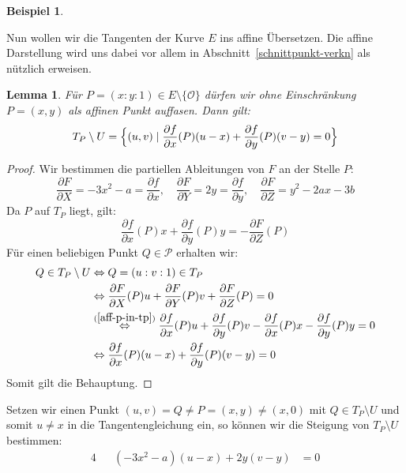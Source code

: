 \documentclass[hidelinks]{article}
\theoremstyle{plain}
\newtheorem{lem}[thm]{Lemma}
\theoremstyle{definition}
\newtheorem{bsp}[thm]{Beispiel}
\theoremstyle{rem}
\newcommand{\patinf}{\mathcal{O}}
\begin{document}
\begin{sloppypar}
\begin{bsp}
\end{bsp}
Nun wollen wir die Tangenten der Kurve $E$ ins affine Übersetzen. Die affine Darstellung wird uns dabei vor allem in Abschnitt~\ref{schnittpunkt-verkn} als nützlich erweisen.
\begin{lem}\label{aff-tang}
    Für $P=(x:y:1)\in E\setminus\{\patinf\}$ dürfen wir ohne Einschränkung $P=(x,y)$ als affinen Punkt auffasen. Dann gilt:
    \begin{equation*}
        T_P\setminus U =\Bigl\{(u,v)\mid \frac{\partial f}{\partial x}(P)(u-x)+\frac{\partial f}{\partial y}(P)(v-y)=0\Bigr\}
    \end{equation*}
\end{lem}
\begin{proof}
    Wir bestimmen die partiellen Ableitungen von $F$ an der Stelle $P$:
    \begin{equation*}
        \frac{\partial F}{\partial X}=-3x^2-a=\frac{\partial f}{\partial x},\quad \frac{\partial F}{\partial Y}=2y=\frac{\partial f}{\partial y},\quad \frac{\partial F}{\partial Z}=y^2-2ax-3b
    \end{equation*}
    Da $P$ auf $T_P$ liegt, gilt:
    \begin{equation}\label{aff-p-in-tp}
        \frac{\partial f}{\partial x}(P)x+\frac{\partial f}{\partial y}(P)y=-\frac{\partial F}{\partial Z}(P)
    \end{equation}
    Für einen beliebigen Punkt $Q\in\mathcal{P}$ erhalten wir:
    \begin{align*}
        Q\in T_P\setminus U & \Leftrightarrow Q=(u:v:1)\in T_P\\
        & \Leftrightarrow \frac{\partial F}{\partial X}(P)u+\frac{\partial F}{\partial Y}(P)v+\frac{\partial F}{\partial Z}(P)=0\\
        & \stackrel{(\ref{aff-p-in-tp})}{\Leftrightarrow} \frac{\partial f}{\partial x}(P)u+\frac{\partial f}{\partial y}(P)v-\frac{\partial f}{\partial x}(P)x-\frac{\partial f}{\partial y}(P)y=0\\
        & \Leftrightarrow \frac{\partial f}{\partial x}(P)(u-x)+\frac{\partial f}{\partial y}(P)(v-y)=0
    \end{align*}
    Somit gilt die Behauptung.
\end{proof}
Setzen wir einen Punkt $(u,v)=Q\ne P=(x,y)\ne(x,0)$ mit $Q\in T_P\setminus U$ und somit $u\ne x$ in die Tangentengleichung ein, so können wir die Steigung von $T_P\setminus U$ bestimmen:
\begin{alignat*}{4}
    &&(-3x^2-a)(u-x)+2y(v-y)&=0\\

\end{alignat*}
\end{sloppypar}
\end{document}
